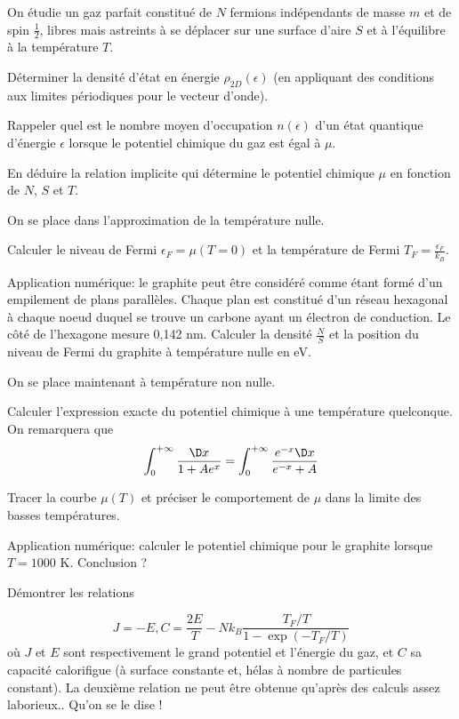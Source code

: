 On étudie un gaz parfait constitué de $N$ fermions indépendants de masse $m$ et de spin $\frac{1}{2}$, libres mais astreints à se déplacer sur une surface d'aire $S$ et à l'équilibre à la température $T$.

\question
Déterminer la densité d'état en énergie $\rho_{2D}(\epsilon)$ (en appliquant des conditions aux limites périodiques pour le vecteur d'onde). 

\question
Rappeler quel est le nombre moyen d'occupation $n(\epsilon)$ d'un état quantique d'énergie $\epsilon$ lorsque le potentiel chimique du gaz est égal à $\mu$.

\question
En déduire la relation implicite qui détermine le potentiel chimique $\mu$ en fonction de $N$, $S$ et $T$.

\medskip

On se place dans l'approximation de la température nulle.

\question
Calculer le niveau de Fermi $\epsilon_F=\mu(T=0)$ et la température de Fermi $T_F=\frac{\epsilon_F}{k_B}$.

\question
Application numérique: le graphite peut être considéré comme étant formé d'un empilement de plans parallèles. Chaque plan est constitué d'un réseau hexagonal à chaque noeud duquel se trouve un carbone ayant un électron de conduction. Le côté de l'hexagone mesure 0,142 nm. Calculer la densité $\frac{N}{S}$ et la position du niveau de Fermi du graphite à température nulle en eV.

\medskip

On se place maintenant à température non nulle.

\question
Calculer l'expression exacte du potentiel chimique à une température quelconque. On remarquera que
$$
\int_0^{+\infty} \frac{\D x}{1+A e^x}=\int_0^{+\infty} \frac{e^{-x} \D x}{e^{-x}+A}
$$

\question
Tracer la courbe $\mu(T)$ et préciser le comportement de $\mu$ dans la limite des basses températures.

\question
Application numérique: calculer le potentiel chimique pour le graphite lorsque $T=1000$ K. Conclusion ?

\question
Démontrer les relations

$$
J=-E,   C=\frac{2E}{T}- Nk_B\frac{T_F/T}{1-\exp(-T_F/T)}
$$
où $J$ et $E$ sont respectivement le grand potentiel et l'énergie du gaz, et $C$ sa capacité calorifigue (à surface constante et, hélas à nombre de particules constant). La deuxième relation ne peut être obtenue qu'après des calculs assez laborieux.. Qu'on se le dise !

